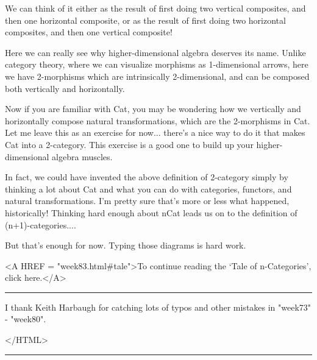 We can think of it either as the result of first doing two vertical
composites, and then one horizontal composite, or as the result of first
doing two horizontal composites, and then one vertical composite!  

Here we can really see why higher-dimensional algebra deserves its name.
Unlike category theory, where we can visualize morphisms as
1-dimensional arrows, here we have 2-morphisms which are intrinsically
2-dimensional, and can be composed both vertically and horizontally.  

Now if you are familiar with Cat, you may be wondering how we vertically
and horizontally compose natural transformations, which are the
2-morphisms in Cat.  Let me leave this as an exercise for now... there's
a nice way to do it that makes Cat into a 2-category.  This exercise is
a good one to build up your higher-dimensional algebra muscles.  

In fact, we could have invented the above definition of 2-category
simply by thinking a lot about Cat and what you can do with categories,
functors, and natural transformations.  I'm pretty sure that's more or
less what happened, historically!  Thinking hard enough about nCat leads
us on to the definition of (n+1)-categories....

But that's enough for now.  Typing those diagrams is hard work.



<A HREF = "week83.html#tale">To continue reading the `Tale of
n-Categories', click here.</A>

\par\noindent\rule{\textwidth}{0.4pt}
I thank Keith Harbaugh for catching lots of typos and other
mistakes in "week73" - "week80".

</HTML>
\par\noindent\rule{\textwidth}{0.4pt}

